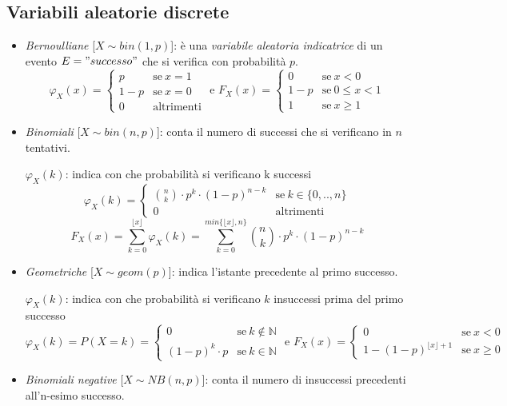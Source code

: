 \documentclass[12pt, a4paper]{report}
\theoremstyle{definition}
\newcommand{\N}{\mathbb{N}}
\begin{document}
\subsection{Variabili aleatorie discrete}
\begin{itemize}
	\item \emph{Bernoulliane} [$X\sim bin(1,p)$]: è una \emph{variabile aleatoria
	indicatrice} di un evento $E="successo"$ che si verifica con probabilità $p$.
    \[\varphi_X(x)=\begin{cases}
		{p} & \text{se}\ {x=1}\\
		{1-p} & \text{se}\ {x=0}\\
		{0} & \text{altrimenti}
	\end{cases}\text{ e }F_X(x)=\begin{cases}
		{0} & \text{se}\ {x<0}\\
		{1-p} & \text{se}\ {0\leq x<1}\\
		{1} & \text{se}\ {x\geq 1}
	\end{cases}\]

	\item \emph{Binomiali} [$X\sim bin(n,p)$]: conta il numero di successi che
	si verificano in $n$ tentativi.

	\(\varphi_X(k)\): indica con che probabilità si verificano k successi
    \[\varphi_X(k)=\begin{cases}
		{\binom{n}{k}\cdot p^k\cdot(1-p)^{n-k}} & \text{se}\ {k\in\{0,..,n\}}\\
		{0} & \text{altrimenti}
	\end{cases}\]
    \[F_X(x)=\sum_{k=0}^{\lfloor x\rfloor}\varphi_X(k)=\sum_{k=0}^{min\{\lfloor
	x\rfloor,n\}}\binom{n}{k}\cdot p^k\cdot(1-p)^{n-k}\]

	\item \emph{Geometriche} [$X\sim geom(p)$]: indica l'istante precedente al
	primo successo.

	\(\varphi_X(k)\): indica con che probabilità si verificano $k$ insuccessi
	prima del primo successo
    \[\varphi_X(k)=P(X=k)=\begin{cases}
		{0} & \text{se}\ {k\notin\N}\\
		{(1-p)^k\cdot p} & \text{se}\ {k\in\N}
	\end{cases}\text{ e }F_X(x)=\begin{cases}
		{0} & \text{se}\ {x<0}\\
		{1-(1-p)^{\lfloor x\rfloor+1}} & \text{se}\ {x\geq 0}
	\end{cases}\]

	\item \emph{Binomiali negative} [$X\sim NB(n,p)$]: conta il numero di
	insuccessi precedenti all'n-esimo successo.


\end{itemize}
\end{document}
